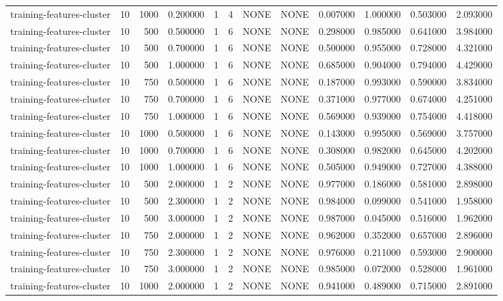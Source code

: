 \begin{tabular}{lrrrllllrrrr}
training-features-cluster & 10 & 1000 & 0.200000 & 1 & 4 & NONE & NONE & 0.007000 & 1.000000 & 0.503000 & 2.093000 \\
training-features-cluster & 10 & 500 & 0.500000 & 1 & 6 & NONE & NONE & 0.298000 & 0.985000 & 0.641000 & 3.984000 \\
training-features-cluster & 10 & 500 & 0.700000 & 1 & 6 & NONE & NONE & 0.500000 & 0.955000 & 0.728000 & 4.321000 \\
training-features-cluster & 10 & 500 & 1.000000 & 1 & 6 & NONE & NONE & 0.685000 & 0.904000 & 0.794000 & 4.429000 \\
training-features-cluster & 10 & 750 & 0.500000 & 1 & 6 & NONE & NONE & 0.187000 & 0.993000 & 0.590000 & 3.834000 \\
training-features-cluster & 10 & 750 & 0.700000 & 1 & 6 & NONE & NONE & 0.371000 & 0.977000 & 0.674000 & 4.251000 \\
training-features-cluster & 10 & 750 & 1.000000 & 1 & 6 & NONE & NONE & 0.569000 & 0.939000 & 0.754000 & 4.418000 \\
training-features-cluster & 10 & 1000 & 0.500000 & 1 & 6 & NONE & NONE & 0.143000 & 0.995000 & 0.569000 & 3.757000 \\
training-features-cluster & 10 & 1000 & 0.700000 & 1 & 6 & NONE & NONE & 0.308000 & 0.982000 & 0.645000 & 4.202000 \\
training-features-cluster & 10 & 1000 & 1.000000 & 1 & 6 & NONE & NONE & 0.505000 & 0.949000 & 0.727000 & 4.388000 \\
training-features-cluster & 10 & 500 & 2.000000 & 1 & 2 & NONE & NONE & 0.977000 & 0.186000 & 0.581000 & 2.898000 \\
training-features-cluster & 10 & 500 & 2.300000 & 1 & 2 & NONE & NONE & 0.984000 & 0.099000 & 0.541000 & 1.958000 \\
training-features-cluster & 10 & 500 & 3.000000 & 1 & 2 & NONE & NONE & 0.987000 & 0.045000 & 0.516000 & 1.962000 \\
training-features-cluster & 10 & 750 & 2.000000 & 1 & 2 & NONE & NONE & 0.962000 & 0.352000 & 0.657000 & 2.896000 \\
training-features-cluster & 10 & 750 & 2.300000 & 1 & 2 & NONE & NONE & 0.976000 & 0.211000 & 0.593000 & 2.900000 \\
training-features-cluster & 10 & 750 & 3.000000 & 1 & 2 & NONE & NONE & 0.985000 & 0.072000 & 0.528000 & 1.961000 \\
training-features-cluster & 10 & 1000 & 2.000000 & 1 & 2 & NONE & NONE & 0.941000 & 0.489000 & 0.715000 & 2.891000 \\

\end{tabular}
